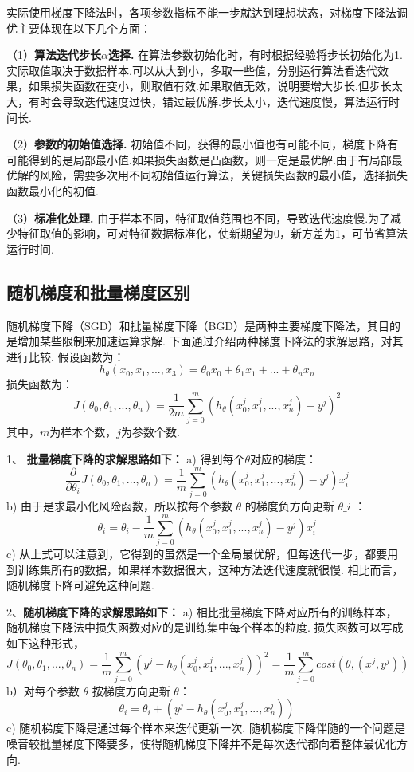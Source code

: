 实际使用梯度下降法时，各项参数指标不能一步就达到理想状态，对梯度下降法调优主要体现在以下几个方面：

（1）\textbf{算法迭代步长$\alpha$选择.}
在算法参数初始化时，有时根据经验将步长初始化为1.实际取值取决于数据样本.可以从大到小，多取一些值，分别运行算法看迭代效果，如果损失函数在变小，则取值有效.如果取值无效，说明要增大步长.但步长太大，有时会导致迭代速度过快，错过最优解.步长太小，迭代速度慢，算法运行时间长.

（2）\textbf{参数的初始值选择.}
初始值不同，获得的最小值也有可能不同，梯度下降有可能得到的是局部最小值.如果损失函数是凸函数，则一定是最优解.由于有局部最优解的风险，需要多次用不同初始值运行算法，关键损失函数的最小值，选择损失函数最小化的初值.

（3）\textbf{标准化处理.}
由于样本不同，特征取值范围也不同，导致迭代速度慢.为了减少特征取值的影响，可对特征数据标准化，使新期望为0，新方差为1，可节省算法运行时间.

\subsection{随机梯度和批量梯度区别}\label{ux968fux673aux68afux5ea6ux548cux6279ux91cfux68afux5ea6ux533aux522b}

​
随机梯度下降（SGD）和批量梯度下降（BGD）是两种主要梯度下降法，其目的是增加某些限制来加速运算求解.
下面通过介绍两种梯度下降法的求解思路，对其进行比较. 假设函数为： \[
h_\theta (x_0,x_1,...,x_3) = \theta_0 x_0 + \theta_1 x_1 + ... + \theta_n x_n
\] 损失函数为： \[
J(\theta_0, \theta_1, ... , \theta_n) = 
            \frac{1}{2m} \sum^{m}_{j=0}(h_\theta (x^{j}_0
    ,x^{j}_1,...,x^{j}_n)-y^j)^2
\] 其中，$m​$为样本个数，$j​$为参数个数.

1、 \textbf{批量梯度下降的求解思路如下：} a) 得到每个$
\theta ​$对应的梯度： \[
\frac{\partial}{\partial \theta_i}J({\theta}_0,{\theta}_1,...,{\theta}_n)=\frac{1}{m}\sum^{m}_{j=0}(h_\theta (x^{j}_0
    ,x^{j}_1,...,x^{j}_n)-y^j)x^{j}_i
\] b) 由于是求最小化风险函数，所以按每个参数 $ \theta ​$
的梯度负方向更新 $ \theta\_i ​$ ： \[
\theta_i=\theta_i - \frac{1}{m} \sum^{m}_{j=0}(h_\theta (x^{j}_0
    ,x^{j}_1,...,x^{j}_n)-y^j)x^{j}_i
\] c)
从上式可以注意到，它得到的虽然是一个全局最优解，但每迭代一步，都要用到训练集所有的数据，如果样本数据很大，这种方法迭代速度就很慢.
相比而言，随机梯度下降可避免这种问题.

2、\textbf{随机梯度下降的求解思路如下：} a)
相比批量梯度下降对应所有的训练样本，随机梯度下降法中损失函数对应的是训练集中每个样本的粒度.
损失函数可以写成如下这种形式， \[
J(\theta_0, \theta_1, ... , \theta_n) = 
            \frac{1}{m} \sum^{m}_{j=0}(y^j - h_\theta (x^{j}_0
            ,x^{j}_1,...,x^{j}_n))^2 = 
            \frac{1}{m} \sum^{m}_{j=0} cost(\theta,(x^j,y^j))
\] b）对每个参数 $ \theta​$ 按梯度方向更新 $ \theta​$： \[
\theta_i = \theta_i + (y^j - h_\theta (x^{j}_0, x^{j}_1, ... ,x^{j}_n))
\] c) 随机梯度下降是通过每个样本来迭代更新一次.
随机梯度下降伴随的一个问题是噪音较批量梯度下降要多，使得随机梯度下降并不是每次迭代都向着整体最优化方向.

